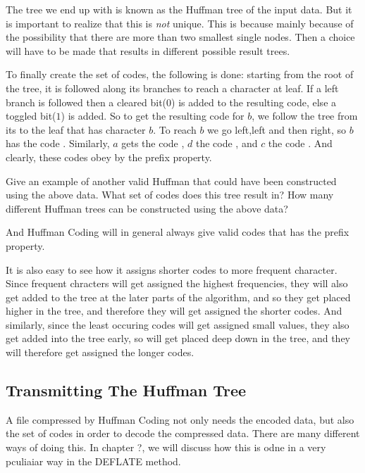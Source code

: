 The tree we end up with is known as the Huffman tree of the input
data. But it is important to realize that this is \textit{not}
unique. This is because mainly because of the possibility that there
are more than two smallest single nodes. Then a choice will have to be
made that results in different possible result trees.

To finally create the set of codes, the following is done: starting
from the root of the tree, it is followed along its branches to reach
a character at leaf. If a left branch is followed then a cleared bit($0$)
is added to the resulting code, else a toggled bit($1$) is added. So
to get the resulting code for $b$, we follow the tree from its to the
leaf that has character $b$. To reach $b$ we go left,left and then
right, so $b$ has the code . Similarly, $a$ gets the code
, $d$ the code , and $c$ the code . And
clearly, these codes obey by the prefix property.

\begin{Exercise}[label={nuther}]
  Give an example of another valid Huffman that could have been
  constructed using the above data. What set of codes does this tree
  result in? How many different Huffman trees can be constructed using
  the above data?
\end{Exercise}

And Huffman Coding will in general always give valid codes that has
the prefix property. %

It is also easy to see how it assigns shorter codes to more frequent
character. Since frequent chracters will get assigned the highest
frequencies, they will also get added to the tree at the later parts
of the algorithm, and so they get placed higher in the tree, and
therefore they will get assigned the shorter codes. And similarly,
since the least occuring codes will get assigned small values, they
also get added into the tree early, so will get placed deep down in
the tree, and they will therefore get assigned the longer codes.

\subsection{Transmitting The Huffman Tree}

A file compressed by Huffman Coding not only needs the encoded data,
but also the set of codes in order to decode the compressed
data. There are many different ways of doing this. In chapter ?, we
will discuss how this is odne in a very pculiaiar way in the DEFLATE method.


